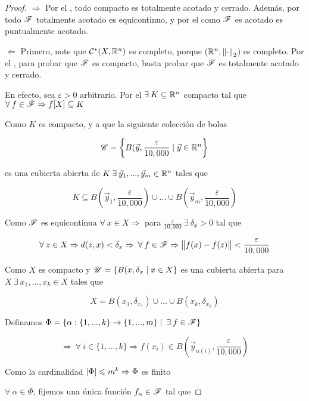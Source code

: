 \begin{proof}
    $\Rightarrow$ Por el , todo compacto es totalmente acotado y cerrado. Además, por  todo $\mathscr{F}$ totalmente acotado es equicontinuo, y por el  como $\mathscr{F}$ es acotado es puntualmente acotado.

    $\Leftarrow$ Primero, note que ${\mathcal{C}}^{\ast}(X,\mathbb{R}^n)$ es completo, porque ($\mathbb{R}^n, \norm{\cdot}_2$) es completo. Por el , para probar que $\mathscr{F}$ es compacto, basta probar que $\mathscr{F}$ es totalmente acotado y cerrado. 

    En efecto, sea $\varepsilon > 0$ arbitrario. Por el  $\exists \: K \subseteq \mathbb{R}^n$ compacto tal que $\forall \: f \in \mathscr{F} \Rightarrow f[X] \subseteq K$

    Como $K$ es compacto, y a que la siguiente colección de bolas

    $$\mathscr{C} = \left\{ B(\vec{y}, \frac{\varepsilon}{10,000} \mid \vec{y} \in \mathbb{R}^n \right\}$$

    es una cubierta abierta de $K \: \exists \: {\vec{y}}_{1}, ..., {\vec{y}}_{m} \in \mathbb{R}^n$ tales que

    $$K \subseteq B \left( {\vec{y}}_{1}, \frac{\varepsilon}{10,000} \right) \cup ... \cup B \left( {\vec{y}}_{m}, \frac{\varepsilon}{10,000} \right)$$

    Como $\mathscr{F}$ es equicontinua $\forall \: x \in X \Rightarrow$ para $\frac{\varepsilon}{10,000} \: \exists \: \delta_x > 0$ tal que

    $$\forall \: z \in X \Rightarrow d(z,x) < \delta_x \Rightarrow\: \forall \: f \in \mathscr{F} \Rightarrow \norm{f(x)-f(z)} < \frac{\varepsilon}{10,000}$$

    Como $X$ es compacto y $\mathscr{U} = \{ B(x,\delta_x \mid x \in X \}$ es una cubierta abierta para $X \: \exists \: x_1, ..., x_k \in X$ tales que

    $$X = B(x_1, \delta_{x_1}) \cup ... \cup B(x_k, \delta_{x_k}) $$

    Definamos $\Phi = \{ \alpha : \{ 1, ..., k \} \to \{1, ..., m\} \mid \: \exists \: f \in \mathscr{F} \}$

    $$\Rightarrow\: \forall \: i \in \{1, ..., k\} \Rightarrow f(x_i) \in B\left({\vec{y}}_{\alpha(i)}, \frac{\varepsilon}{10,000} \right)$$

    Como la cardinalidad $\abs{\Phi} \leqslant m^k \Rightarrow \Phi$ es finito

    $\forall \: \alpha \in \Phi$, fijemos una única función $f_\alpha \in \mathscr{F}$ tal que


\end{proof}
